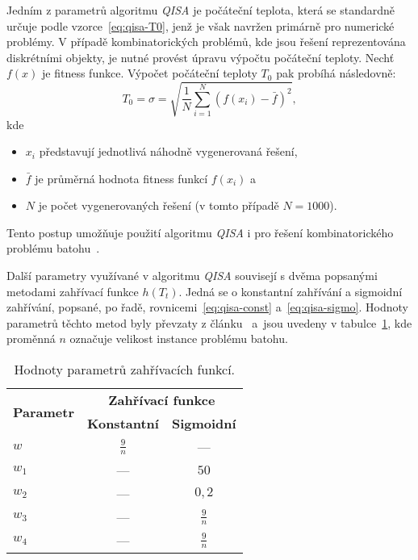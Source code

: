Jedním z parametrů algoritmu \emph{QISA} je počáteční teplota, která se standardně určuje podle vzorce~\ref{eq:qisa-T0}, jenž je však navržen primárně pro numerické problémy. 
V případě kombinatorických problémů, kde jsou řešení reprezentována diskrétními objekty, je nutné provést úpravu výpočtu počáteční teploty. 
Nechť $f\left(x\right)$ je fitness funkce. Výpočet počáteční teploty $T_0$ pak probíhá následovně:
\begin{equation}\label{eq:qisa-std}
    T_0 = \sigma = \sqrt{\frac{1}{N}\sum_{i=1}^{N}\left( f\left(x_i\right) - \bar{f}\right)^2},
\end{equation}
kde
\begin{itemize}
    \item $x_i$ představují jednotlivá náhodně vygenerovaná řešení,
    \item $\bar{f}$ je průměrná hodnota fitness funkcí $f\left(x_i\right)$ a
    \item $N$ je počet vygenerovaných řešení (v tomto případě $N=1000$).
\end{itemize}
Tento postup umožňuje použití algoritmu \emph{QISA} i pro řešení kombinatorického problému batohu~\cite{qisa,FundamentalsOfProbability}. 

Další parametry využívané v algoritmu \emph{QISA} souvisejí s dvěma popsanými metodami zahřívací funkce $h\left(T_t\right)$. 
Jedná se o konstantní zahřívání a sigmoidní zahřívání, popsané, po řadě, rovnicemi~\ref{eq:qisa-const} a~\ref{eq:qisa-sigmo}. 
Hodnoty parametrů těchto metod byly převzaty z článku~\cite{qisa} a~jsou uvedeny v tabulce~\ref{tab:qisa-heating-params}, kde proměnná $n$ označuje velikost instance problému batohu.
\begin{table}[ht]
    \centering
    \begin{tabular}{lcc}
      \toprule
      \multirow{2}{*}{\textbf{Parametr}}  & \multicolumn{2}{c}{\textbf{Zahřívací funkce}} \\
      \cmidrule(lr){2-3}
            & \textbf{Konstantní}  & \textbf{Sigmoidní} \\
      \midrule
      $w$   & $\frac{9}{n}$        & ---                \\[1ex]
      $w_1$ & ---                  & $50$               \\[1ex]
      $w_2$ & ---                  & $0,2$              \\[1ex]
      $w_3$ & ---                  & $\frac{9}{n}$      \\[1ex]
      $w_4$ & ---                  & $\frac{9}{n}$      \\
      \bottomrule
    \end{tabular}
    \caption{Hodnoty parametrů zahřívacích funkcí.}
    \label{tab:qisa-heating-params}
\end{table}

